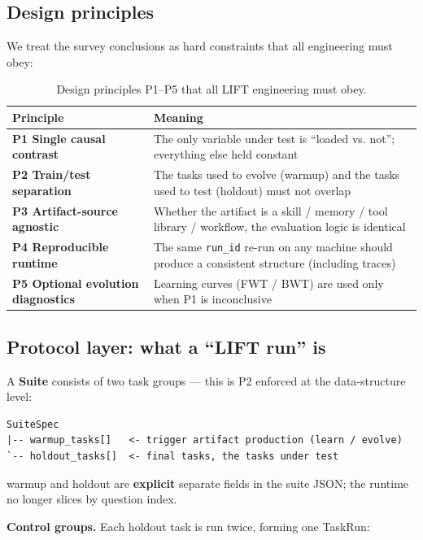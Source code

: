 \documentclass{article}
\begin{document}
\subsection{Design principles}
\label{sec:design-principles}

We treat the survey conclusions as hard constraints that all engineering must obey:

\begin{table}[H]
\centering
\caption{Design principles P1--P5 that all LIFT engineering must obey.}
\label{tab:principles}
\begin{tabular}{P{0.32\textwidth}P{0.6\textwidth}}
\toprule
Principle & Meaning \\
\midrule
\textbf{P1 Single causal contrast} & The only variable under test is ``loaded vs. not''; everything else held constant \\
\textbf{P2 Train/test separation} & The tasks used to evolve (warmup) and the tasks used to test (holdout) must not overlap \\
\textbf{P3 Artifact-source agnostic} & Whether the artifact is a skill / memory / tool library / workflow, the evaluation logic is identical \\
\textbf{P4 Reproducible runtime} & The same \texttt{run\_id} re-run on any machine should produce a consistent structure (including traces) \\
\textbf{P5 Optional evolution diagnostics} & Learning curves (FWT / BWT) are used only when P1 is inconclusive \\
\bottomrule
\end{tabular}
\end{table}

\subsection{Protocol layer: what a ``LIFT run'' is}

A \textbf{Suite} consists of two task groups --- this is P2 enforced at the data-structure level:

\begin{lstlisting}
SuiteSpec
|-- warmup_tasks[]   <- trigger artifact production (learn / evolve)
`-- holdout_tasks[]  <- final tasks, the tasks under test
\end{lstlisting}

warmup and holdout are \textbf{explicit} separate fields in the suite JSON; the runtime no longer slices by question index.

\textbf{Control groups.} Each holdout task is run twice, forming one TaskRun:
\end{document}
